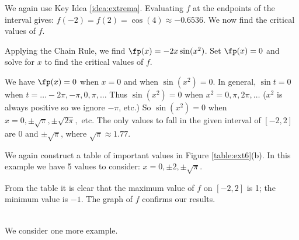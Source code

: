{}
{We again use Key Idea \ref{idea:extrema}. Evaluating $f$ at the endpoints of the interval gives: $f(-2) = f(2) = \cos (4) \approx -0.6536.$ We now find the critical values of $f$.

Applying the Chain Rule, we find $\fp(x) = -2x\sin (x^2)$. Set $\fp(x) = 0$ and solve for $x$ to find the critical values of $f$. 

We have $\fp(x) = 0$ when $x = 0$ and when $\sin (x^2) = 0$. In general, $\sin t = 0$ when $t = \ldots -2\pi, -\pi, 0, \pi, \ldots$ Thus $\sin (x^2) = 0$ when $x^2 = 0, \pi, 2\pi, \ldots$ ($x^2$ is always positive so we ignore $-\pi$, etc.) So $\sin (x^2)=0$ when $x= 0, \pm \sqrt{\pi}, \pm\sqrt{2\pi},$ etc. The only values to fall in the given interval of $[-2,2]$ are $0$ and $\pm\sqrt{\pi}$, where $\sqrt{\pi} \approx 1.77$.

We again construct a table of important values in Figure \ref{table:ext6}(b). In this example we have 5 values to consider: $x= 0, \pm 2, \pm\sqrt{\pi}$. 


From the table it is clear that the maximum value of $f$ on $[-2,2]$ is 1; the minimum value is $-1$. The graph of $f$ confirms our results.
}\\

We consider one more example.\\


